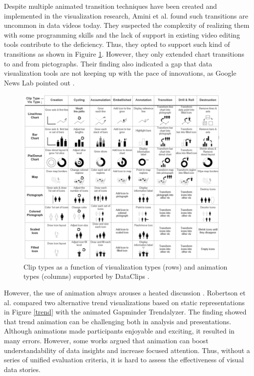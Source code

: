 Despite multiple animated transition techniques have been created and implemented in the visualization research, Amini et al. \cite{Amini2017} found such transitions are uncommon in data videos today. They suspected the complexity of realizing them with some programming skills and the lack of support in existing video editing tools contribute to the deficiency. Thus, they opted to support such kind of transitions as shown in Figuire \ref{lens}. However, they only extended  chart transitions \cite{Heer2007} to and from pictographs. Their finding  also indicated a gap that data visualization tools are not keeping up with the pace of innovations, as Google News Lab pointed out \cite{GoogleNews}. 

\begin{figure}[htb]
	\centering 
	\includegraphics[width=0.95\textwidth]{figure/lens.png} 
	\caption{ Clip types as a function of  visualization types (rows)  and animation types  (columns) supported by DataClips \cite{Amini2017}. } 
	\label{lens} 
\end{figure}

However, the use of animation always arouses a heated discussion \cite{Fisher2010}. Robertson et al. \cite{Robertson2008} compared two alternative trend visualizations based on static representations in Figure \ref{trend} with the animated Gapminder Trendalyzer. The finding showed that trend animation can be challenging both in analysis and presentations. Although animations made participants enjoyable and exciting, it resulted in many errors. However, some works \cite{Amini2018, Heer2007} argued that animation can boost understandability of data insights and increase focused attention. Thus, without a series of unified evaluation criteria, it is hard to assess the effectiveness of visual data stories.

